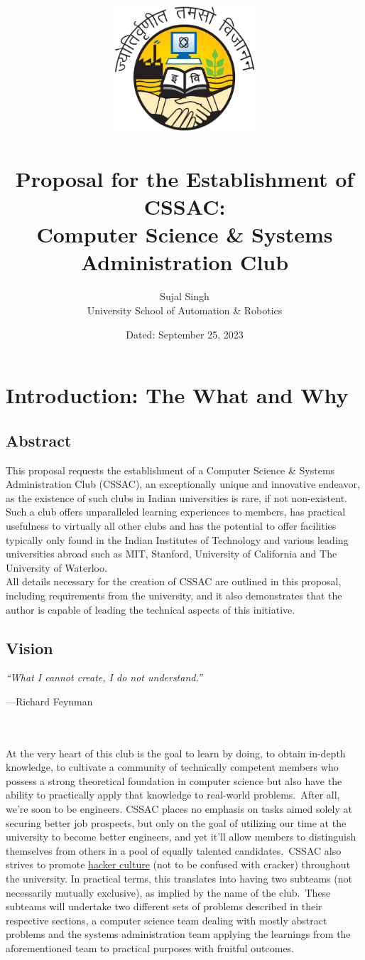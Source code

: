\documentclass[11pt,twocolumn,oneside]{book}
\title{
    \includegraphics[width=150pt]{./images/ipu}
    \\
    \textbf{\\Proposal for the Establishment of CSSAC: \\ Computer Science \& Systems Administration Club}
}
\author{Sujal Singh \\ University School of Automation \& Robotics}
\date{Dated: September 25, 2023}
\begin{document}
    \maketitle
    \tableofcontents


    \chapter{Introduction: The What and Why}\label{ch:introduction}


    \section{Abstract}\label{sec:abstract}
    This proposal requests the establishment of a Computer Science \& Systems Administration Club (CSSAC), an
    exceptionally unique and innovative endeavor, as the existence of such clubs in Indian universities is rare, if not
    non-existent.
    Such a club offers unparalleled learning experiences to members, has practical usefulness to virtually all other
    clubs and has the potential to offer facilities typically only found in the Indian Institutes of Technology and
    various leading universities abroad such as MIT, Stanford, University of California and The University of Waterloo.
    \\
    All details necessary for the creation of CSSAC are outlined in this proposal, including requirements from the
    university, and it also demonstrates that the author is capable of leading the technical aspects of this initiative.


    \section{Vision}\label{sec:vision}
    \emph{``What I cannot create, I do not understand.''}{\par\hfill\small{---Richard Feynman}}
    \\\\
    At the very heart of this club is the goal to learn by doing, to obtain in-depth knowledge, to cultivate a community
    of technically competent members who possess a strong theoretical foundation in computer science but also have the
    ability to practically apply that knowledge to real-world problems.\ After all, we're soon to be engineers.
    CSSAC places no emphasis on tasks aimed solely at securing better job prospects, but only on the goal of
    utilizing our time at the university to become better engineers, and yet it'll allow members to distinguish
    themselves from others in a pool of equally talented candidates.\ CSSAC also strives to promote
    \href{https://wikipedia.org/wiki/Hacker_culture}{\color{blue}\underline{hacker culture}} (not to be confused with
    cracker) throughout the university.
    In practical terms, this translates into having two subteams (not necessarily mutually exclusive), as implied by the
    name of the club.\ These subteams will undertake two different sets of problems described in their respective
    sections, a computer science team dealing with mostly abstract problems and the systems administration team applying
    the learnings from the aforementioned team to practical purposes with fruitful outcomes.
\end{document}

